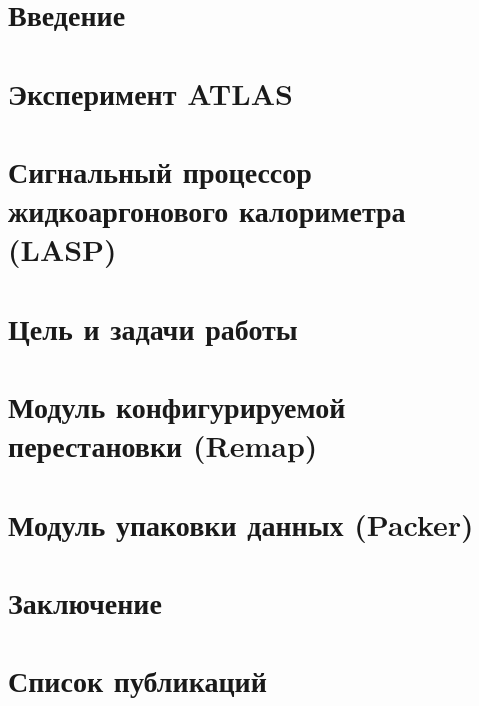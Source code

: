 \documentclass[a4paper, 14pt]{extarticle}
\begin{document}


\tableofcontents
\thispagestyle{empty}
\newpage

\setcounter{page}{3}
\section*{Введение}
    
    \newpage

\section{Эксперимент ATLAS}
    
    \newpage

\section{Сигнальный процессор жидкоаргонового калориметра (LASP)}
    
    \newpage

\section{Цель и задачи работы}
    
    \newpage

\section{Модуль конфигурируемой перестановки (Remap)}
    
    \newpage

\section{Модуль упаковки данных (Packer)}
    
\newpage

\section*{Заключение}
    
    \newpage

\section*{Список публикаций}
    
    \newpage

%
\printbibliography

\end{document}
